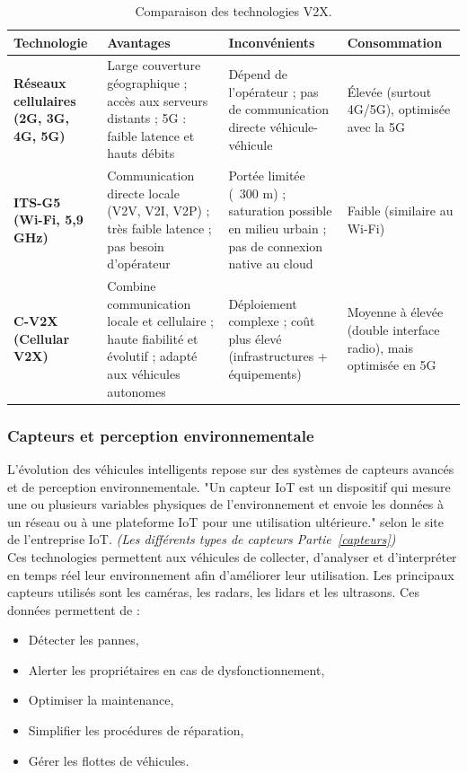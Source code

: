\begin{table}[H]
\centering
\begin{tabular}{|p{3cm}|p{4cm}|p{4cm}|p{3cm}|}
\hline
\textbf{Technologie} & \textbf{Avantages} & \textbf{Inconvénients} & \textbf{Consommation} \\
\hline
\textbf{Réseaux cellulaires (2G, 3G, 4G, 5G)} 
& Large couverture géographique ; accès aux serveurs distants ; 5G : faible latence et hauts débits 
& Dépend de l’opérateur ; pas de communication directe véhicule-véhicule 
& Élevée (surtout 4G/5G), optimisée avec la 5G \\
\hline
\textbf{ITS-G5 (Wi-Fi, 5,9 GHz)} 
& Communication directe locale (V2V, V2I, V2P) ; très faible latence ; pas besoin d’opérateur 
& Portée limitée (~300 m) ; saturation possible en milieu urbain ; pas de connexion native au cloud 
& Faible (similaire au Wi-Fi) \\
\hline
\textbf{C-V2X (Cellular V2X)} 
& Combine communication locale et cellulaire ; haute fiabilité et évolutif ; adapté aux véhicules autonomes 
& Déploiement complexe ; coût plus élevé (infrastructures + équipements) 
& Moyenne à élevée (double interface radio), mais optimisée en 5G \\
\hline
\end{tabular}
\caption{Comparaison des technologies V2X.}
\end{table}

\subsubsection{Capteurs et perception environnementale}
L'évolution des véhicules intelligents repose sur des systèmes de capteurs avancés et de perception environnementale. "Un capteur IoT est un dispositif qui mesure une ou plusieurs variables physiques de l'environnement et envoie les données à un réseau ou à une plateforme IoT pour une utilisation ultérieure." selon le site de l'entreprise IoT\cite{iot_capteur}. \emph{(Les différents types de capteurs Partie~\ref{capteurs})}\\
Ces technologies permettent aux véhicules de collecter, d'analyser et d'interpréter en temps réel leur environnement afin d'améliorer leur utilisation.
Les principaux capteurs utilisés sont les caméras, les radars, les lidars et les ultrasons.
Ces données permettent de :
\begin{itemize}
    \item Détecter les pannes,
    \item Alerter les propriétaires en cas de dysfonctionnement,
    \item Optimiser la maintenance,
    \item Simplifier les procédures de réparation,
    \item Gérer les flottes de véhicules. 
\end{itemize}

